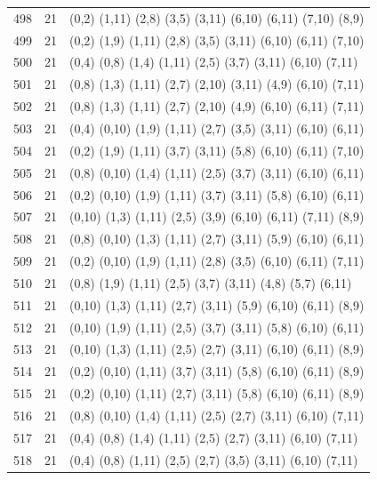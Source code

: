 \begin{appendix}
{\begin{longtable}{lll}
    498& 21 & (0,2)   (1,11)  (2,8)   (3,5)   (3,11)  (6,10)  (6,11)  (7,10)  (8,9)\\
    499& 21 & (0,2)   (1,9)   (1,11)  (2,8)   (3,5)   (3,11)  (6,10)  (6,11)  (7,10)\\
    500& 21 & (0,4)   (0,8)   (1,4)   (1,11)  (2,5)   (3,7)   (3,11)  (6,10)  (7,11)\\
    501& 21 & (0,8)   (1,3)   (1,11)  (2,7)   (2,10)  (3,11)  (4,9)   (6,10)  (7,11)\\
    502& 21 & (0,8)   (1,3)   (1,11)  (2,7)   (2,10)  (4,9)   (6,10)  (6,11)  (7,11)\\
    503& 21 & (0,4)   (0,10)  (1,9)   (1,11)  (2,7)   (3,5)   (3,11)  (6,10)  (6,11)\\
    504& 21 & (0,2)   (1,9)   (1,11)  (3,7)   (3,11)  (5,8)   (6,10)  (6,11)  (7,10)\\
    505& 21 & (0,8)   (0,10)  (1,4)   (1,11)  (2,5)   (3,7)   (3,11)  (6,10)  (6,11)\\
    506& 21 & (0,2)   (0,10)  (1,9)   (1,11)  (3,7)   (3,11)  (5,8)   (6,10)  (6,11)\\
    507& 21 & (0,10)  (1,3)   (1,11)  (2,5)   (3,9)   (6,10)  (6,11)  (7,11)  (8,9)\\
    508& 21 & (0,8)   (0,10)  (1,3)   (1,11)  (2,7)   (3,11)  (5,9)   (6,10)  (6,11)\\
    509& 21 & (0,2)   (0,10)  (1,9)   (1,11)  (2,8)   (3,5)   (6,10)  (6,11)  (7,11)\\
    510& 21 & (0,8)   (1,9)   (1,11)  (2,5)   (3,7)   (3,11)  (4,8)   (5,7)   (6,11)\\
    511& 21 & (0,10)  (1,3)   (1,11)  (2,7)   (3,11)  (5,9)   (6,10)  (6,11)  (8,9)\\
    512& 21 & (0,10)  (1,9)   (1,11)  (2,5)   (3,7)   (3,11)  (5,8)   (6,10)  (6,11)\\
    513& 21 & (0,10)  (1,3)   (1,11)  (2,5)   (2,7)   (3,11)  (6,10)  (6,11)  (8,9)\\
    514& 21 & (0,2)   (0,10)  (1,11)  (3,7)   (3,11)  (5,8)   (6,10)  (6,11)  (8,9)\\
    515& 21 & (0,2)   (0,10)  (1,11)  (2,7)   (3,11)  (5,8)   (6,10)  (6,11)  (8,9)\\
    516& 21 & (0,8)   (0,10)  (1,4)   (1,11)  (2,5)   (2,7)   (3,11)  (6,10)  (7,11)\\
    517& 21 & (0,4)   (0,8)   (1,4)   (1,11)  (2,5)   (2,7)   (3,11)  (6,10)  (7,11)\\
    518& 21 & (0,4)   (0,8)   (1,11)  (2,5)   (2,7)   (3,5)   (3,11)  (6,10)  (7,11)\\

\end{longtable}}
\end{appendix}
